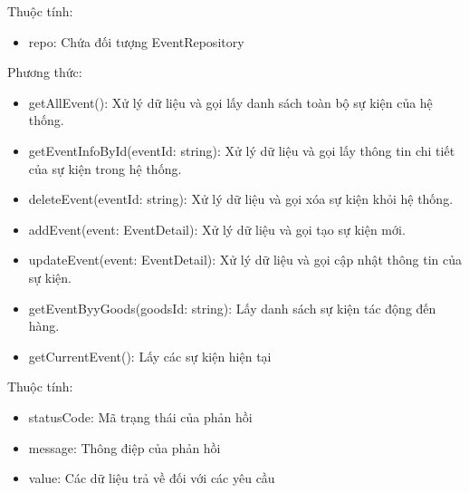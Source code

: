 Thuộc tính:
\begin{itemize}
	\item repo: Chứa đối tượng EventRepository
\end{itemize}
Phương thức:
\begin{itemize}
	\item getAllEvent(): Xử lý dữ liệu và gọi lấy danh sách toàn bộ sự kiện của hệ thống.
	\item getEventInfoById(eventId: string): Xử lý dữ liệu và gọi lấy thông tin chi tiết của sự kiện trong hệ thống.
	\item deleteEvent(eventId: string): Xử lý dữ liệu và gọi xóa sự kiện khỏi hệ thống.
	\item addEvent(event: EventDetail): Xử lý dữ liệu và gọi tạo sự kiện mới.
	\item updateEvent(event: EventDetail): Xử lý dữ liệu và gọi cập nhật thông tin của sự kiện.
	\item getEventByyGoods(goodsId: string): Lấy danh sách sự kiện tác động đến hàng.
	\item getCurrentEvent(): Lấy các sự kiện hiện tại
\end{itemize}

Thuộc tính:
\begin{itemize}
	\item statusCode: Mã trạng thái của phản hồi
	\item message: Thông điệp của phản hồi
	\item value: Các dữ liệu trả về đối với các yêu cầu
\end{itemize}

\newpage



